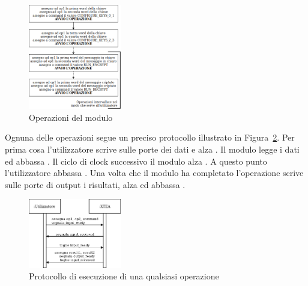 \begin{figure}[ht]
    \centering
    \includegraphics[width=0.36\textwidth]{vhdl_schemi/algo.png}
    \caption{Operazioni del modulo}
    \label{fig:algo}
\end{figure}

Ognuna delle operazioni segue un preciso protocollo illustrato in Figura~\ref{fig:handshake}. Per prima cosa l'utilizzatore scrive sulle porte dei dati e alza . Il modulo legge i dati ed abbassa . Il ciclo di clock successivo il modulo alza . A questo punto l'utilizzatore abbassa . Una volta che il modulo ha completato l'operazione scrive sulle porte di output i risultati, alza  ed abbassa . 

\begin{figure}[ht]
    \centering
    \includegraphics[width=0.36\textwidth]{vhdl_schemi/handshake.png}
    \caption{Protocollo di esecuzione di una qualsiasi operazione}
    \label{fig:handshake}
\end{figure}